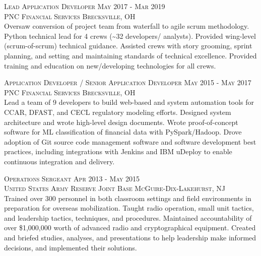 \documentclass[letterpaper, 11pt]{article} %
\begin{document}
\textsc{Lead Application Developer \hfill May 2017 - Mar 2019} \\
\textsc{PNC Financial Services \hfill Brecksville, OH} \\
Oversaw conversion of project team from waterfall to agile scrum methodology.
Python technical lead for 4 crews (\textasciitilde 32 developers/ analysts).
Provided wing-level (scrum-of-scrum) technical guidance.
Assisted crews with story grooming, sprint planning, and setting and maintaining standards of technical excellence.
Provided training and education on new/developing technologies for all crews.

\textsc{Application Developer / Senior Application Developer \hfill May 2015 - May 2017} \\
\textsc{PNC Financial Services \hfill Brecksville, OH} \\
Lead a team of 9 developers to build web-based and system automation tools for CCAR, DFAST, and CECL regulatory modeling efforts.
Designed system architecture and wrote high-level design documents.
Wrote proof-of-concept software for ML classification of financial data with PySpark/Hadoop.
Drove adoption of Git source code management software and software development best practices, including integrations with Jenkins and IBM uDeploy to enable continuous integration and delivery.


\textsc{Operations Sergeant \hfill Apr 2013 - May 2015} \\
\textsc{United States Army Reserve \hfill Joint Base McGuire-Dix-Lakehurst, NJ} \\
Trained over 300 personnel in both classroom settings and field environments in preparation for overseas mobilization.
Taught radio operation, small unit tactics, and leadership tactics, techniques, and procedures.
Maintained accountability of over \$1,000,000 worth of advanced radio and cryptographical equipment.
Created and briefed studies, analyses, and presentations to help leadership make informed decisions, and implemented their solutions.
\end{document}
